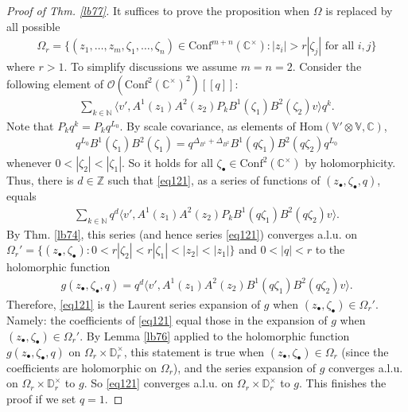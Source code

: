 \documentclass[12pt,a4paper,notitlepage]{article}
\theoremstyle{definition}
\theoremstyle{plain}
\newcommand{\Hom}{\mathrm{Hom}}
\newcommand{\Conf}{\mathrm{Conf}}
\newcommand{\bk}[1]{\langle {#1}\rangle}
\newcommand{\scr}{\mathscr}
\newcommand{\blt}{\bullet}
\newcommand{\Vbb}{\mathbb V}
\newcommand{\Cbb}{\mathbb C}
\newcommand{\Nbb}{\mathbb N}
\newcommand{\Zbb}{\mathbb Z}
\newcommand{\Dbb}{\mathbb D}
\numberwithin{equation}{section}
\begin{document}
\begin{proof}[Proof of Thm. \ref{lb77}]
It suffices to prove the proposition when $\Omega$ is replaced by all possible
\begin{align*}
	\Omega_r=\{(z_1,\dots,z_m,\zeta_1,\dots,\zeta_n)\in\Conf^{m+n}(\Cbb^\times):|z_i|>r|\zeta_j|\text{ for all }i,j\}
\end{align*}
where $r>1$. To simplify discussions we assume $m=n=2$. Consider the following element of $\scr O(\Conf^2(\Cbb^\times)^2)[[q]]$:
\begin{align}
\sum_{k\in\Nbb}\bk{v',A^1(z_1)A^2(z_2)P_kB^1(\zeta_1)B^2(\zeta_2)v}q^k.\label{eq121}
\end{align}
Note that $P_kq^k=P_kq^{L_0}$. By scale covariance, as elements of $\Hom(\Vbb'\otimes\Vbb,\Cbb)$,
\begin{align}
q^{L_0}B^1(\zeta_1)B^2(\zeta_1)=q^{\Delta_{B^1}+\Delta_{B^2}}B^1(q\zeta_1)B^2(q\zeta_2)q^{L_0}	
\end{align}
whenever $0<|\zeta_2|<|\zeta_1|$. So it holds for all $\zeta_\blt\in\Conf^2(\Cbb^\times)$ by holomorphicity. Thus, there is  $d\in\Zbb$ such that \eqref{eq121}, as a series of functions of $(z_\blt,\zeta_\blt,q)$, equals
\begin{align}
\sum_{k\in\Nbb}q^d\bk{v',A^1(z_1)A^2(z_2)P_kB^1(q\zeta_1)B^2(q\zeta_2)v}.	
\end{align}
By Thm. \ref{lb74}, this series (and hence series \eqref{eq121}) converges a.l.u. on $\Omega_r'=\{(z_\blt,\zeta_\blt):0<r|\zeta_2|<r|\zeta_1|<|z_2|<|z_1|\}$ and $0<|q|<r$ to the holomorphic function
\begin{align*}
g(z_\blt,\zeta_\blt,q)=q^d	\bk{v',A^1(z_1)A^2(z_2)B^1(q\zeta_1)B^2(q\zeta_2)v}.
\end{align*}
Therefore, \eqref{eq121} is the Laurent series expansion of $g$ when $(z_\blt,\zeta_\blt)\in\Omega_r'$. Namely: the coefficients of \eqref{eq121} equal those in the expansion of $g$ when $(z_\blt,\zeta_\blt)\in\Omega_r'$. By Lemma \ref{lb76} applied to the holomorphic function $g(z_\blt,\zeta_\blt,q)$ on $\Omega_r\times\Dbb_r^\times$, this statement is true when $(z_\blt,\zeta_\blt)\in\Omega_r$ (since the coefficients are holomorphic on $\Omega_r$), and the series expansion of $g$  converges a.l.u. on $\Omega_r\times\Dbb_r^\times$ to $g$. So \eqref{eq121} converges a.l.u. on $\Omega_r\times\Dbb_r^\times$ to $g$. This finishes the proof if we set $q=1$.
\end{proof}
\end{document}
